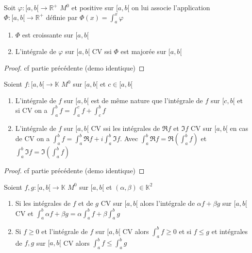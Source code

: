 \documentclass[11pt,hidelinks]{book}
\theoremstyle{mytheoremstyle}
\theoremstyle{mytheoremstyle}
\theoremstyle{mytheoremstyle}
\theoremstyle{mytheoremstyle}
\theoremstyle{mytheoremstyle}
\theoremstyle{mytheoremstyle}
\theoremstyle{mytheoremstyle}
\theoremstyle{mytheoremstyle}
\theoremstyle{myproblemstyle}
\def\mbb#1{\mathbb{#1}}
\def\bR{\mbb{R}}
\def\ib#1{\int_{a}^{b} #1}
\def\bK{\mbb{K}}
\def\ab{[a,b[}
\newcommand{\func}[3]{#1\colon#2\to#3}
\newcommand{\parenth}[1]{\left(#1\right)}
\begin{document}
    \begin{adjustwidth}{-2em}{-1em}
        \begin{theorem}
            Soit $\func{\varphi}{\ab}{\bR^+}$ $M^0$ et positive sur $\ab$
            on lui associe l'application $\func{\Phi}{\ab}{\bR^+}$ définie par 
            $\Phi(x) = \int_{a}^{x} \varphi$ 
            \begin{enumerate} 
            \item $\Phi$ est croissante sur $\ab$ 
            \item L'intégrale de $\varphi$ sur $\ab$ CV ssi $\Phi$ est majorée sur $\ab$
            \end{enumerate}
            \begin{proof}
                cf partie précédente (demo identique)
            \end{proof} 
        \end{theorem}
        \begin{prop}
            Soient $\func{f}{\ab}{\bK}$ $M^0$ sur $\ab$ et $c \in \ab$ 
            \begin{enumerate}
            \item L'intégrale de $f$ sur $\ab$ est de même nature que l'intégrale 
            de $f$ sur $[c,b[$ et si CV on a $\ib{f} = \int_{a}^{c} f + \int_{c}^{b} f$ 
            \item L'intégrale de $f$ sur $\ab$ CV ssi les intégrales de $\Re f$ et $\Im f$ CV sur $\ab$ 
            en cas de CV on a $\ib{f} = \ib{\Re f} + i \ib{\Im f}$. Avec $\ib{\Re f} = \Re \parenth{\ib{f}}$ et $\ib{\Im f} = \Im \parenth{\ib{f}}$
            \end{enumerate}
            \begin{proof}
                cf partie précédente (demo identique)
            \end{proof}
        \end{prop}
        \begin{prop}
            Soient $\func{f,g}{\ab}{\bK}$ $M^0$ sur $\ab$ et $(\alpha, \beta) \in \bK^2$ 
            \begin{enumerate} 
            \item Si les intégrales de $f$ et de $g$ CV sur $\ab$ alors l'intégrale de $\alpha f + \beta g$ sur $\ab$
            CV et $\ib{\alpha f + \beta g} = \alpha \ib{f} + \beta \ib{g}$
            \item Si $f \geq 0$ et l'intégrale de $f$ sur $\ab$ CV alors $\ib{f} \geq 0$
            et si $f \leq g$ et intégrales de $f,g$ sur $\ab$ CV alors $\ib{f} \leq \ib{g}$

\end{enumerate}
\end{prop}
\end{adjustwidth}
\end{document}
